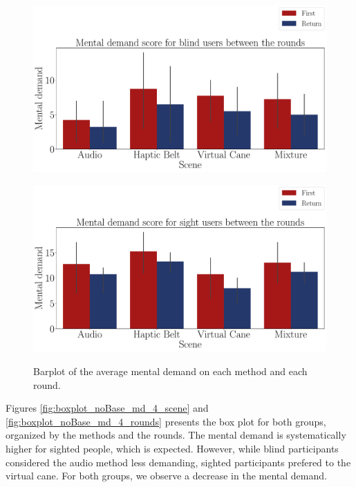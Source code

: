 \begin{figure}[!thb]
    \centering
    \begin{minipage}{\textwidth}
        \centering
        \includegraphics[width = \textwidth]{Resultados/Nasa/Figuras/pdf/barplot_md_avg_4_scene_blind.pdf}
        \label{fig:barplot_md_avg_4_scene_blind}
    \end{minipage}
    \begin{minipage}{\textwidth}
        \centering
        \includegraphics[width = \textwidth]{Resultados/Nasa/Figuras/pdf/barplot_md_avg_4_scene_sight.pdf}
        \label{fig:barplot_md_avg_4_scene_sight}
    \end{minipage}
    \caption{Barplot of the average mental demand on each method and each round.}
    \label{fig:barplot_md_avg_4_scene_blind_sight}
\end{figure}

Figures \ref{fig:boxplot_noBase_md_4_scene} and \ref{fig:boxplot_noBase_md_4_rounds} presents the box plot for both groups, organized by the methods and the rounds. The mental demand is systematically higher for sighted people, which is expected. However, while blind participants considered the audio method less demanding, sighted participants prefered to the virtual cane. For both groups, we observe a decrease in the mental demand.

